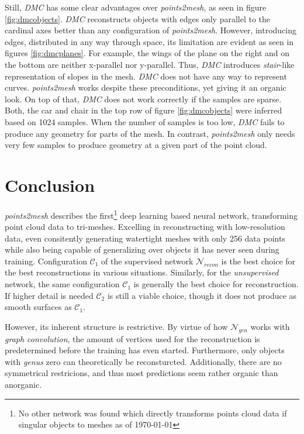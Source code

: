   Still, \emph{DMC} has some clear advantages over \emph{points2mesh}, as seen in figure \ref{fig:dmcobjects}. \emph{DMC} reconstructs objects with edges only 
  parallel to the cardinal axes better than any configuration of \emph{points2mesh}. However, introducing edges, distributed in any way through space,
  its limitation are evident as seen in figures \ref{fig:dmcplanes}. For example, the wings of the plane on the right and on the bottom are neither x-parallel nor y-parallel.
  Thus, \emph{DMC} introduces \emph{stair}-like representation of slopes in the mesh. \emph{DMC} does not have any way to represent curves. \emph{points2mesh}
  works despite these preconditions, yet giving it an organic look.
  On top of that, \emph{DMC} does not work correctly if the samples are sparse. Both, the car and chair in the top row of figure \ref{fig:dmcobjects} were inferred based on 1024 samples.
  When the number of samples is too low, \emph{DMC} fails to produce any geometry for parts of the mesh.
  In contrast, \emph{points2mesh} only needs very few samples to produce geometry at a given part of the point cloud.

\section{Conclusion}
\label{conclusion}
  \emph{points2mesh} describes the first\footnote{No other network was found which directly transforms points cloud data if singular objects to meshes as of \today} deep
  learning based neural network, transforming point cloud data to tri-meshes. Excelling in reconstructing with low-resolution data,
  even consitently generating watertight meshes with only 256 data points while also being capable of generalizing over objects it has never seen 
  during training. Configuration $\mathcal{C}_1$ of the supervised network $\mathcal{N}_{recon}$ is the best choice for the best reconstructions
  in various situations. Similarly, for the \emph{unsupervised} network, the same configuration $\mathcal{C}_1$ is generally the best choice for reconstruction.
  If higher detail is needed $\mathcal{C}_2$ is still a viable choice, though it does not produce as smooth surfaces as $\mathcal{C}_1$.

  However, its inherent structure is restrictive. By virtue of how $\mathcal{N}_{gcn}$ works with \emph{graph convolution}, the amount
  of vertices used for the reconstruction is predetermined before the training has even started. Furthermore, only objects with \emph{genus} zero 
  can theoretically be reconsturcted. Additionally, there are no symmetrical restricions, and thus most predictions seem rather organic than anorganic.

